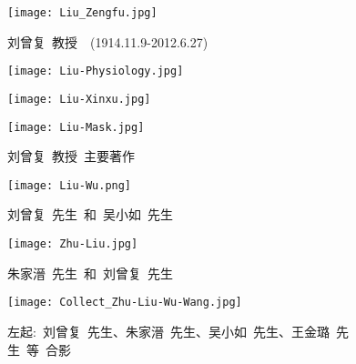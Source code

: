 \newpage
\pagestyle{empty}    %
\begin{figure}[h!]
\centering
\vspace{+0.2in}
\texttt{[image: Liu\_Zengfu.jpg]}
\caption*{\hei 刘曾复~教授~~(1914.11.9-2012.6.27)}
\label{Liu_Zengfu}
\end{figure}

\newpage
\begin{figure}[h!]
\centering
\vspace{-0.2in}
\texttt{[image: Liu-Physiology.jpg]}
\label{Liu-Physiology}
\end{figure}
\begin{figure}[hbtp!]
\hspace*{-0.4in}
\begin{minipage}[t]{0.48\textwidth}
	\centering
\texttt{[image: Liu-Xinxu.jpg]}
\end{minipage}
\hspace{0.3in}
\begin{minipage}[t]{0.48\textwidth}
	\centering
\texttt{[image: Liu-Mask.jpg]}
\end{minipage}
\vspace{1.0pt}
\caption*{\hei 刘曾复~教授~主要著作}
\label{Major_Works}
\end{figure}

\newpage
\begin{figure}[h!]
\centering
\texttt{[image: Liu-Wu.png]}
\caption*{\hei 刘曾复~先生~和~吴小如~先生}
\label{Collect_Liu_Wu}
\end{figure}

\newpage
\begin{figure}[h!]
\centering
\texttt{[image: Zhu-Liu.jpg]}
\caption*{\hei 朱家溍~先生~和~刘曾复~先生}
\label{Collect_Zhu_Wu}
\end{figure}

\begin{figure}[h!]
\centering
\texttt{[image: Collect\_Zhu-Liu-Wu-Wang.jpg]}
\caption*{\hei 左起:~刘曾复~先生、朱家溍~先生、吴小如~先生、王金璐~先生~等~合影}
\label{Collect_Liy_Zhu_Wu_Wang}
\end{figure}

